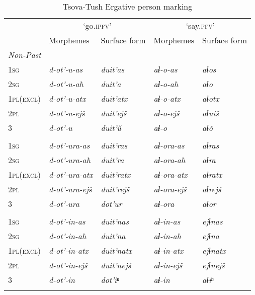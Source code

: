\begin{table}
	\begin{tabular}{l ll ll}
		\lsptoprule
	     & \multicolumn{2}{c}{`go.\textsc{ipfv}'}     &  \multicolumn{2}{c}{`say.\textsc{pfv}'}\\\cmidrule(lr){2-3}\cmidrule(lr){4-5}
		 & {Morphemes} & {Surface form}               & {Morphemes} & {Surface form} \\
		\midrule
		
		\multicolumn{5}{l}{\itshape Non-Past} \\
		\textsc{1sg} & \textit{d-ot'-u-as} & \textit{duit'as} & \textit{aɬ-o-as} & \textit{aɬos} \\
		\textsc{2sg} & \textit{d-ot'-u-aħ} & \textit{duit'a} & \textit{aɬ-o-aħ} & \textit{aɬo} \\
		\textsc{1pl(excl)} & \textit{d-ot'-u-atx} & \textit{duit'atx}  & \textit{aɬ-o-atx} & \textit{aɬotx} \\
		\textsc{2pl} & \textit{d-ot'-u-ejš} & \textit{duit'ejš} & \textit{aɬ-o-ejš} & \textit{aɬuiš} \\
		\textsc{3} & \textit{d-ot'-u} & \textit{duit'\u{u}}  & \textit{aɬ-o} & \textit{aɬ\u{o}} \\\addlinespace
		
		\multicolumn{5}{l}{\itshape Imperfect} \\
		\textsc{1sg} & \textit{d-ot'-ura-as} & \textit{duit'ras}  & \textit{aɬ-ora-as} & \textit{aɬras} \\
		\textsc{2sg} & \textit{d-ot'-ura-aħ} & \textit{duit'ra}  & \textit{aɬ-ora-aħ} & \textit{aɬra} \\
		\textsc{1pl(excl)} & \textit{d-ot'-ura-atx} & \textit{duit'ratx} & \textit{aɬ-ora-atx} & \textit{aɬratx}\\
		\textsc{2pl} & \textit{d-ot'-ura-ejš} & \textit{duit'rejš} & \textit{aɬ-ora-ejš} & \textit{aɬrejš} \\
		\textsc{3} & \textit{d-ot'-ura} & \textit{dot'ur}  & \textit{aɬ-ora} & \textit{aɬor} \\\addlinespace
		
		\multicolumn{5}{l}{\itshape Aorist} \\
		\textsc{1sg} & \textit{d-ot'-in-as} & \textit{duit'nas}  & \textit{aɬ-in-as} & \textit{ejɬnas}\\
		\textsc{2sg} & \textit{d-ot'-in-aħ} & \textit{duit'na}  & \textit{aɬ-in-aħ} & \textit{ejɬna} \\
		\textsc{1pl(excl)} & \textit{d-ot'-in-atx} & \textit{duit'natx} & \textit{aɬ-in-atx} & \textit{ejɬnatx} \\
		\textsc{2pl} & \textit{d-ot'-in-ejš} & \textit{duit'nejš}  & \textit{aɬ-in-ejš} & \textit{ejɬnejš} \\
		\textsc{3} & \textit{d-ot'-in} & \textit{dot'iⁿ}  & \textit{aɬ-in} & \textit{aɬiⁿ}\\
		\lspbottomrule
		
	\end{tabular}
	\caption{Tsova-Tush Ergative person marking}
	\label{verbalperson-table1}
\end{table}


